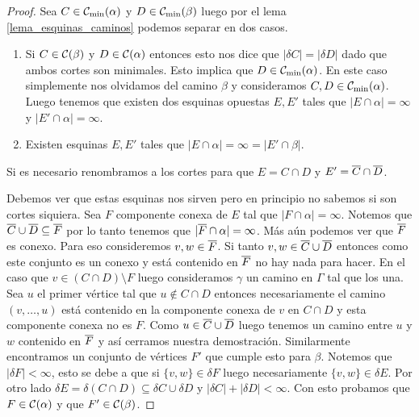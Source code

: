 \documentclass[tesis.tex]{subfiles}
\begin{document}
\begin{proof}
	Sea $C \in {\cal C}_{\text{min}}(\alpha)$ y $D \in {\cal C}_{\text{min}}(\beta)$ luego por el lema \ref{lema_esquinas_caminos} podemos separar en dos casos.
	\begin{enumerate}
		\item Si $C \in {\cal C}(\beta)$ y $D \in {\cal C}(\alpha)$ entonces esto nos dice que $|\delta C| = |\delta D|$ dado que ambos cortes son minimales.
		Esto implica que $D \in {\cal C}_{\text{min}}(\alpha)$. 
		En este caso simplemente nos olvidamos del camino $\beta$ y consideramos $C,D \in {\cal C}_{\text{min}}(\alpha)$.
		Luego tenemos que existen dos esquinas opuestas $E,E'$ tales que $|E \cap \alpha| = \infty$ y $|E' \cap \alpha| = \infty$.
		\item Existen esquinas $E,E'$ tales que $|E \cap \alpha| = \infty = |E' \cap \beta|$.
	\end{enumerate}	
	
	Si es necesario renombramos a los cortes para que $E = C \cap D$ y $E' = \overline C \cap \overline D$.
	
		
	Debemos ver que estas esquinas nos sirven pero en principio no sabemos si son cortes siquiera.
	Sea $F$ componente conexa de $E$ tal que $|F \cap \alpha| = \infty$.
	Notemos que $\overline C \cup \overline D \subseteq \overline F$ por lo tanto tenemos que $|\overline F \cap \alpha|=\infty$.
	Más aún podemos ver que $\overline F$ es conexo.
	Para eso consideremos $v,w \in \overline F$.
	Si tanto $v,w \in \overline C \cup \overline D$ entonces como este conjunto es un conexo y está contenido en $\overline F$ no hay nada para hacer.
	En el caso que $v \in (C \cap D) \setminus F$ luego consideramos $\gamma$ un camino en $\Gamma$ tal que los una.
	Sea $u$ el primer vértice tal que $u \notin C \cap D$ entonces necesariamente el camino $(v, \dots, u)$ está contenido en la componente conexa de $v$ en $C \cap D$ y esta componente conexa no es $F$. 
	Como $u \in \overline C \cup \overline D$ luego tenemos un camino entre $u$ y $w$ contenido en $\overline F$ y así cerramos nuestra demostración.
	Similarmente encontramos un conjunto de vértices $F'$ que cumple esto para $\beta$.
	Notemos que $|\delta F| < \infty$, esto se debe a que si $\{ v,w \} \in \delta F$ luego necesariamente $\{v,w\} \in \delta E$.
	Por otro lado $\delta E = \delta (C \cap D)  \subseteq \delta C \cup \delta D$ y $|\delta C| + |\delta D| < \infty$. 
	Con esto probamos que $F \in {\cal C}(\alpha)$ y que $F' \in {\cal C}(\beta)$.
	
	

\end{proof}
\end{document}
